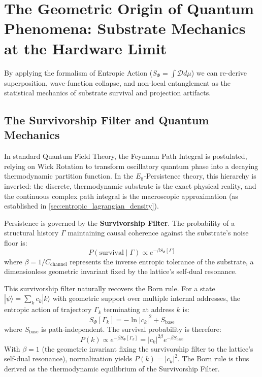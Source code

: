 \section{The Geometric Origin of Quantum Phenomena: Substrate Mechanics at the Hardware Limit}
\label{app:quantum_fundamentals}

By applying the formalism of Entropic Action ($S_\Phi = \int \mathcal{D} d\mu$) we can re-derive superposition, wave-function collapse, and non-local entanglement as the statistical mechanics of substrate survival and projection artifacts.

\subsection{The Survivorship Filter and Quantum Mechanics}

In standard Quantum Field Theory, the Feynman Path Integral is postulated, relying on Wick Rotation to transform oscillatory quantum phase into a decaying thermodynamic partition function. In the $E_8$-Persistence theory, this hierarchy is inverted: the discrete, thermodynamic substrate is the exact physical reality, and the continuous complex path integral is the macroscopic approximation (as established in \cref{sec:entropic_lagrangian_density}).

Persistence is governed by the \textbf{Survivorship Filter}. The probability of a structural history $\Gamma$ maintaining causal coherence against the substrate's noise floor is:
\begin{equation}
    P(\text{survival} \mid \Gamma) \propto e^{-\beta S_\Phi[\Gamma]}
\end{equation}
where $\beta = 1/C_{\text{channel}}$ represents the inverse entropic tolerance of the substrate, a dimensionless geometric invariant fixed by the lattice's self-dual resonance.

This survivorship filter naturally recovers the Born rule. For a state $|\psi\rangle = \sum_k c_k |k\rangle$ with geometric support over multiple internal addresses, the entropic action of trajectory $\Gamma_k$ terminating at address $k$ is:
\begin{equation}
    S_\Phi[\Gamma_k] = -\ln |c_k|^2 + S_{\text{base}}
\end{equation}
where $S_{\text{base}}$ is path-independent. The survival probability is therefore:
\begin{equation}
    P(k) \propto e^{-\beta S_\Phi[\Gamma_k]} = |c_k|^{2\beta} e^{-\beta S_{\text{base}}}
\end{equation}
With $\beta = 1$ (the geometric invariant fixing the survivorship filter to the lattice's self-dual resonance), normalization yields $P(k) = |c_k|^2$. The Born rule is thus derived as the thermodynamic equilibrium of the Survivorship Filter.

